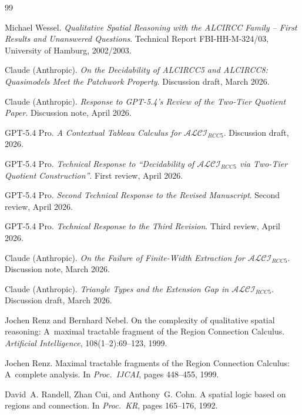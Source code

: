 \documentclass[a4paper,11pt]{article}
\theoremstyle{definition}
\begin{document}
\begin{thebibliography}{99}

Michael Wessel.
\newblock \emph{Qualitative Spatial Reasoning with the ALCIRCC Family
  -- First Results and Unanswered Questions}.
\newblock Technical Report FBI-HH-M-324/03, University of Hamburg,
  2002/2003.

Claude (Anthropic).
\newblock \emph{On the Decidability of ALCIRCC5 and ALCIRCC8:
  Quasimodels Meet the Patchwork Property}.
\newblock Discussion draft, March 2026.

Claude (Anthropic).
\newblock \emph{Response to GPT-5.4's Review of the Two-Tier Quotient
  Paper}.
\newblock Discussion note, April 2026.

GPT-5.4 Pro.
\newblock \emph{A Contextual Tableau Calculus for
  $\mathcal{ALCI}_{\mathit{RCC5}}$}.
\newblock Discussion draft, 2026.

GPT-5.4 Pro.
\newblock \emph{Technical Response to ``Decidability of
  $\mathcal{ALCI}_{\mathit{RCC5}}$ via Two-Tier Quotient
  Construction''}.
\newblock First review, April 2026.

GPT-5.4 Pro.
\newblock \emph{Second Technical Response to the Revised Manuscript}.
\newblock Second review, April 2026.

GPT-5.4 Pro.
\newblock \emph{Technical Response to the Third Revision}.
\newblock Third review, April 2026.

Claude (Anthropic).
\newblock \emph{On the Failure of Finite-Width Extraction for
  $\mathcal{ALCI}_{\mathit{RCC5}}$}.
\newblock Discussion note, March 2026.

Claude (Anthropic).
\newblock \emph{Triangle Types and the Extension Gap in
  $\mathcal{ALCI}_{\mathit{RCC5}}$}.
\newblock Discussion draft, March 2026.

Jochen Renz and Bernhard Nebel.
\newblock On the complexity of qualitative spatial reasoning:
  A~maximal tractable fragment of the Region Connection Calculus.
\newblock \emph{Artificial Intelligence}, 108(1--2):69--123, 1999.

Jochen Renz.
\newblock Maximal tractable fragments of the Region Connection
  Calculus: A~complete analysis.
\newblock In \emph{Proc.\ IJCAI}, pages 448--455, 1999.

David~A. Randell, Zhan Cui, and Anthony~G. Cohn.
\newblock A spatial logic based on regions and connection.
\newblock In \emph{Proc.\ KR}, pages 165--176, 1992.

\end{thebibliography}
\end{document}
